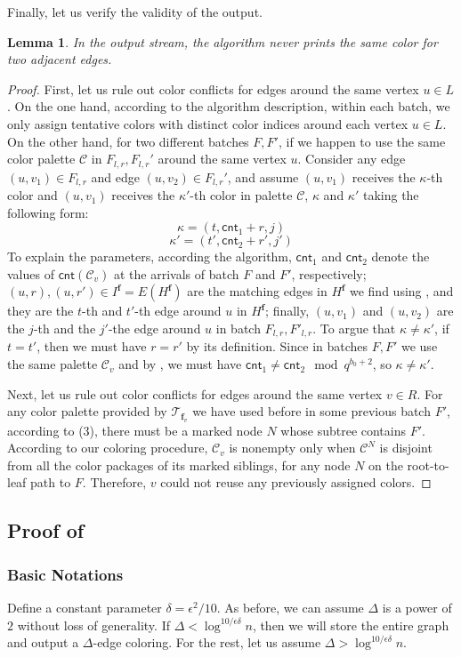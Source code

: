 \documentclass[11pt,a4paper]{article}
\newtheorem{lemma}{Lemma}[section]
\newcommand{\tree}{\mathcal{T}}
\newcommand{\freq}{\mathbf{f}}
\newcommand{\clr}{\mathcal{C}}
\newcommand{\cnt}{\mathsf{cnt}}
\newcommand{\brac}[1]{\left(#1\right)}
\begin{document}
Finally, let us verify the validity of the output.
\begin{lemma}
	In the output stream, the algorithm never prints the same color for two adjacent edges.
\end{lemma}
\begin{proof}
	First, let us rule out color conflicts for edges around the same vertex $u\in L$. On the one hand, according to the algorithm description, within each batch, we only assign tentative colors with distinct color indices around each vertex $u\in L$. On the other hand, for two different batches $F, F'$, if we happen to use the same color palette $\clr$ in $F_{l, r}, F_{l, r}'$ around the same vertex $u$. Consider any edge $(u, v_1)\in F_{l, r}$ and edge $(u, v_2)\in F_{l, r}'$, and assume $(u, v_1)$ receives the $\kappa$-th color and $(u, v_1)$ receives the $\kappa'$-th color in palette $\clr$, $\kappa$ and $\kappa'$ taking the following form:
	$$\kappa = \brac{t, \cnt_1 + r, j}$$
	$$\kappa' = \brac{t', \cnt_2 + r', j'}$$
	To explain the parameters, according the algorithm, $\cnt_1$ and $\cnt_2$ denote the values of $\cnt(\clr_v)$ at the arrivals of batch $F$ and $F'$, respectively; $(u, r), (u, r')\in I^\freq = E(H^\freq)$ are the matching edges in $H^\freq$ we find using , and they are the $t$-th and $t'$-th edge around $u$ in $H^\freq$; finally, $(u, v_1)$ and $(u, v_2)$ are the $j$-th and the $j'$-the edge around $u$ in batch $F_{l, r}, F'_{l, r}$. To argue that $\kappa\neq\kappa'$, if $t = t'$, then we must have $r = r'$ by its definition. Since in batches $F, F'$ we use the same palette $\clr_v$ and by , we must have $\cnt_1\neq \cnt_2 \mod q^{b_0+2}$, so $\kappa\neq \kappa'$.
	
	Next, let us rule out color conflicts for edges around the same vertex $v\in R$. For any color palette provided by $\tree_{\freq_v}$ we have used before in some previous batch $F'$, according to (3), there must be a marked node $N$ whose subtree contains $F'$. According to our coloring procedure, $\clr_v$ is nonempty only when $\clr^{N}$ is disjoint from all the color packages of its marked siblings, for any node $N$ on the root-to-leaf path to $F$. Therefore, $v$ could not reuse any previously assigned colors.
\end{proof}

\subsection{Proof of }
\subsubsection{Basic Notations}
Define a constant parameter $\delta = \epsilon^2/10$. As before, we can assume $\Delta$ is a power of $2$ without loss of generality. If $\Delta < \log^{10/\epsilon\delta}n$, then we will store the entire graph and output a $\Delta$-edge coloring. For the rest, let us assume $\Delta > \log^{10/\epsilon\delta}n$.
\end{document}
